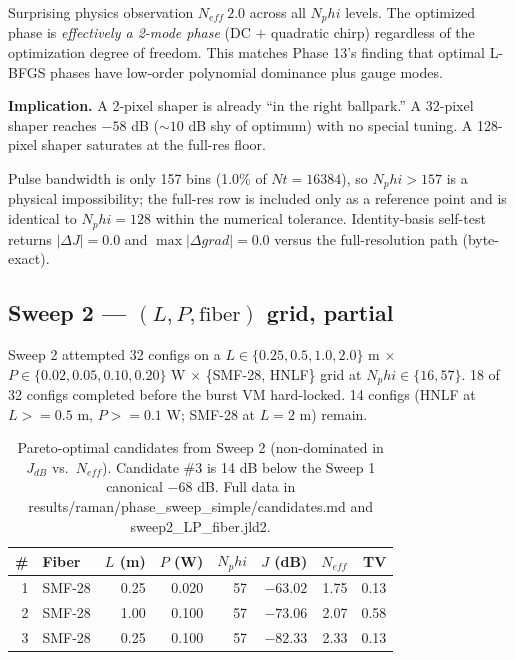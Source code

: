 \documentclass[11pt,letterpaper]{article}
\def\varphi{phi}%
\def\mathrm#1{#1}%
\def\geq{>=}%
\def\approx{~}%
\def\texttt#1{#1}%
\begin{document}
\begin{keyfinding}{Surprising physics observation}
$\mathrm{N}_{\mathrm{eff}} \approx 2.0$ across all $\mathrm{N}_\varphi$ levels. The optimized phase is \emph{effectively a 2-mode phase} (DC $+$ quadratic chirp) regardless of the optimization degree of freedom. This matches Phase 13's finding that optimal L-BFGS phases have low-order polynomial dominance plus gauge modes.

\textbf{Implication.} A 2-pixel shaper is already ``in the right ballpark.'' A 32-pixel shaper reaches $-58$ dB ($\sim 10$ dB shy of optimum) with no special tuning. A 128-pixel shaper saturates at the full-res floor.
\end{keyfinding}

Pulse bandwidth is only 157 bins (1.0\% of $\mathrm{Nt} = 16384$), so $\mathrm{N}_\varphi > 157$ is a physical impossibility; the full-res row is included only as a reference point and is identical to $\mathrm{N}_\varphi = 128$ within the numerical tolerance. Identity-basis self-test returns $|\Delta J| = 0.0$ and $\max|\Delta \mathrm{grad}| = 0.0$ versus the full-resolution path (byte-exact).

\subsection{Sweep 2 --- $(L, P, \text{fiber})$ grid, partial}

Sweep 2 attempted 32 configs on a $L \in \{0.25, 0.5, 1.0, 2.0\}$ m $\times$ $P \in \{0.02, 0.05, 0.10, 0.20\}$ W $\times$ \{SMF-28, HNLF\} grid at $\mathrm{N}_\varphi \in \{16, 57\}$. 18 of 32 configs completed before the burst VM hard-locked. 14 configs (HNLF at $L \geq 0.5$ m, $P \geq 0.1$ W; SMF-28 at $L=2$ m) remain.

\begin{table}[H]
\centering
\small
\begin{tabular}{rlrrrrrr}
\toprule
\# & Fiber & $L$ (m) & $P$ (W) & $\mathrm{N}_\varphi$ & $J$ (dB) & $\mathrm{N}_{\mathrm{eff}}$ & TV \\
\midrule
1 & SMF-28 & 0.25 & 0.020 & 57 & $-63.02$           & 1.75 & 0.13 \\
2 & SMF-28 & 1.00 & 0.100 & 57 & $-73.06$           & 2.07 & 0.58 \\
3 & SMF-28 & 0.25 & 0.100 & 57 & $\mathbf{-82.33}$  & 2.33 & 0.13 \\
\bottomrule
\end{tabular}
\caption{Pareto-optimal candidates from Sweep 2 (non-dominated in $J_{\mathrm{dB}}$ vs.\ $\mathrm{N}_{\mathrm{eff}}$). Candidate \#3 is 14 dB below the Sweep 1 canonical $-68$ dB. Full data in \texttt{results/raman/phase\_sweep\_simple/candidates.md} and \texttt{sweep2\_LP\_fiber.jld2}.}
\end{table}
\end{document}
